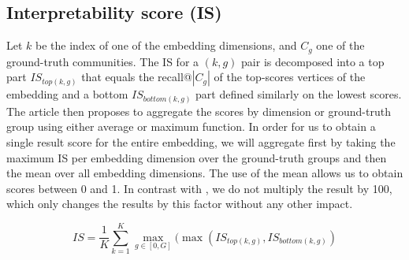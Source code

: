\subsection{Interpretability score (IS)}
Let $k$ be the index of one of the embedding dimensions, and $C_g$ one of the ground-truth communities. The IS for a $(k, g)$ pair is decomposed into a top part $IS_{top(k, g)}$ 
that equals the recall@$|C_g|$ of the top-scores vertices of the embedding
and a bottom $IS_{bottom(k, g)}$ part defined similarly on the lowest scores.
The article then proposes to aggregate the scores by dimension or ground-truth group using either average or maximum function. %
In order for us to obtain a single result score for the entire embedding, we will aggregate first by taking the maximum IS per embedding dimension over the ground-truth groups and then the mean over all embedding dimensions.
The use of the mean allows us to obtain scores between 0 and 1. %
In contrast with \cite{gogoglou_2019}, we do not multiply the result by 100, which only changes the results by this factor without any other impact.

\begin{equation}
    IS = \frac{1}{K}\sum_{k=1}^K \max_{g \in [0, G]}(\max(IS_{top(k,g)}, IS_{bottom(k,g)})
\end{equation}

